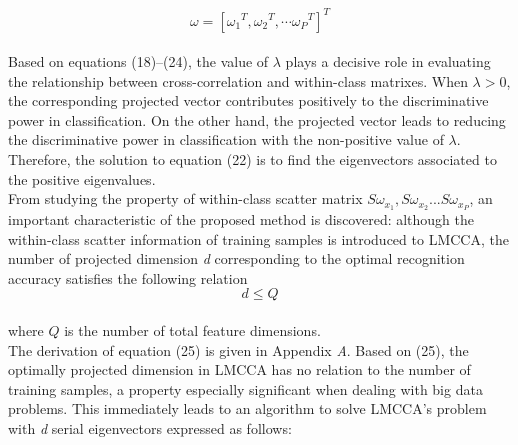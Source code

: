 \documentclass[journal]{IEEEtran}
\begin{document}
\begin{equation} \omega  = {[{\omega _1}^T,{\omega _2}^T, \cdots {\omega _P}^T]^T}\end{equation}
\\\indent Based on equations (18)--(24), the value of ${\lambda}$ plays a decisive role in evaluating the relationship between cross-correlation and within-class matrixes. When ${\lambda}>0$, the corresponding projected vector contributes positively to the discriminative power in classification. On the other hand, the projected vector leads to reducing the discriminative power in classification with the non-positive value of ${\lambda}$. Therefore, the solution to equation (22) is to find the eigenvectors associated to the positive eigenvalues.\\\indent From studying the property of within-class scatter matrix $ {S{\omega_{{x_1}}}}, {S{\omega_{{x_2}}}}...{S{\omega_{{x_P}}}} $, an important characteristic of the proposed method is discovered: although the within-class scatter information of training samples is introduced to LMCCA, the number of projected dimension \emph{d} corresponding to the optimal recognition accuracy satisfies the following relation
\begin{equation} \ d \le Q\ \end{equation}\\
where $Q$ is the number of total feature dimensions.\\\indent
The derivation of equation (25) is given in Appendix \emph{A}. Based on (25), the optimally projected dimension in LMCCA has no relation to the number of training samples, a property especially significant when dealing with big data problems. This immediately leads to an algorithm to solve LMCCA's problem with \textit{d} serial eigenvectors expressed as follows:%
\end{document}
